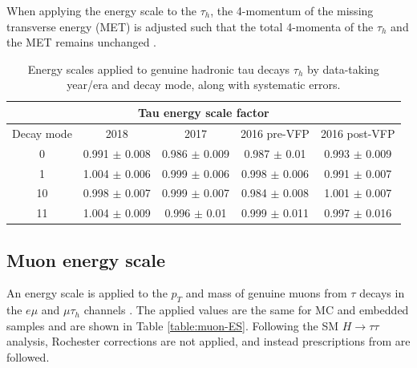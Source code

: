 When applying the energy scale to the $\tau_{h}$, the 4-momentum of the missing transverse energy (MET) is adjusted such that the total 4-momenta of the $\tau_{h}$ and the MET remains unchanged \cite{twiki_TAU_POG_tauidrecommendationforrun2}.

\begin{table}[ht]
    \centering
    \begin{tabular}{|c|c|c|c|c|}
    \hline
    \multicolumn{5}{|c|}{Tau energy scale factor}                                   \\ \hline
    \hline
    Decay mode      & 2018              & 2017              & 2016 pre-VFP      & 2016 post-VFP     \\ \hline
    0               & 0.991 $\pm$ 0.008 & 0.986 $\pm$ 0.009 & 0.987 $\pm$ 0.01  & 0.993 $\pm$ 0.009 \\
    1               & 1.004 $\pm$ 0.006 & 0.999 $\pm$ 0.006 & 0.998 $\pm$ 0.006 & 0.991 $\pm$ 0.007 \\
    10              & 0.998 $\pm$ 0.007 & 0.999 $\pm$ 0.007 & 0.984 $\pm$ 0.008 & 1.001 $\pm$ 0.007 \\
    11              & 1.004 $\pm$ 0.009 & 0.996 $\pm$ 0.01  & 0.999 $\pm$ 0.011 & 0.997 $\pm$ 0.016 \\ \hline
    \end{tabular}
    \caption{Energy scales applied to genuine hadronic tau decays $\tau_{h}$ by data-taking year/era and decay mode, along with systematic errors.}
    \label{table:tau-ES}
\end{table}

\subsection{Muon energy scale}
\label{sec:muon_energy_scale}

An energy scale is applied to the $p_{T}$ and mass of genuine muons from $\tau$ decays in the $e\mu$ and $\mu\tau_{h}$ channels \cite{twiki_MUON_POG_recommendation}. The applied values are the same for MC and embedded samples and are shown in Table \ref{table:muon-ES}. Following the SM $H \rightarrow \tau\tau$ analysis, Rochester corrections are not applied, and instead prescriptions from \cite{twiki_MUO_simplified_ES} are followed.


